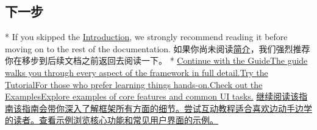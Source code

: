 \begin{paracol}{2}
\subsection{下一步}
\switchcolumn[0]*%
If you skipped the
\href{https://vuejs.org/guide/introduction.html}{Introduction}, we
strongly recommend reading it before moving on to the rest of the
documentation.
\switchcolumn
如果你尚未阅读\href{https://cn.vuejs.org/guide/introduction.html}{简介}，我们强烈推荐你在移步到后续文档之前返回去阅读一下。
\switchcolumn[0]*%
\href{https://vuejs.org/guide/essentials/application.html}{Continue with
the GuideThe guide walks you through every aspect of the framework in
full detail.}\href{https://vuejs.org/tutorial/}{Try the TutorialFor
those who prefer learning things
hands-on.}\href{https://vuejs.org/examples/}{Check out the
ExamplesExplore examples of core features and common UI tasks.}
\switchcolumn
\href{https://cn.vuejs.org/guide/essentials/application.html}{继续阅读该指南该指南会带你深入了解框架所有方面的细节。}\href{https://cn.vuejs.org/tutorial/}{尝试互动教程适合喜欢边动手边学的读者。}\href{https://cn.vuejs.org/examples/}{查看示例浏览核心功能和常见用户界面的示例。}
\end{paracol}
